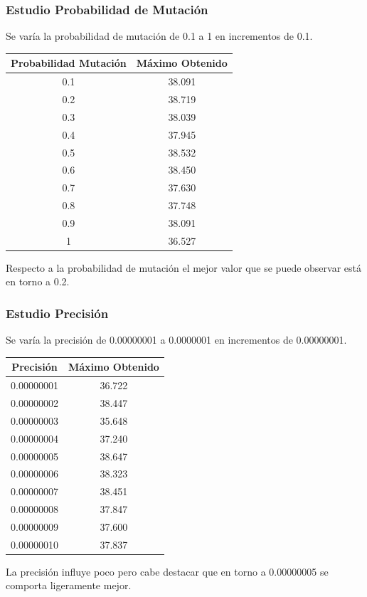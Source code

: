 \documentclass[12pt]{article}
\begin{document}
\subsubsection*{Estudio Probabilidad de Mutación}
	Se varía la probabilidad de mutación de 0.1 a 1 en incrementos de 0.1.
\begin{table}[H]
\begin{center}
\begin{tabular}{|cc|} \hline
Probabilidad Mutación & Máximo Obtenido \\  \hline
0.1 & 38.091 \\ 
0.2 & 38.719 \\ 
0.3 & 38.039 \\
0.4 & 37.945 \\
0.5 & 38.532 \\
0.6 & 38.450 \\
0.7 & 37.630 \\
0.8 & 37.748 \\ 
0.9 & 38.091 \\
1   & 36.527 \\  \hline
\end{tabular}
\end{center}
\end{table}
	Respecto a la probabilidad de mutación el mejor valor que se puede observar está en torno a 0.2.

\subsubsection*{Estudio Precisión}
	Se varía la precisión de 0.00000001 a 0.0000001 en incrementos de 0.00000001.
\begin{table}[H]
\begin{center}
\begin{tabular}{|cc|} \hline
Precisión & Máximo Obtenido \\  \hline
0.00000001 & 36.722 \\ 
0.00000002 & 38.447 \\ 
0.00000003 & 35.648 \\
0.00000004 & 37.240 \\
0.00000005 & 38.647 \\
0.00000006 & 38.323 \\
0.00000007 & 38.451\\
0.00000008 & 37.847 \\ 
0.00000009 & 37.600 \\
0.00000010 & 37.837 \\  \hline
\end{tabular}
\end{center}
\end{table}
	La precisión influye poco pero cabe destacar que en torno a 0.00000005 se comporta ligeramente mejor. 
\end{document}
